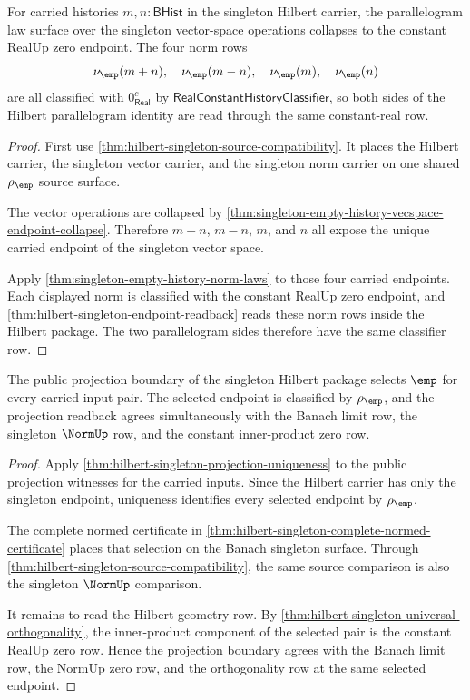 \begin{theorem}
\label{thm:hilbert-singleton-parallelogram-collapse}
For carried histories $m,n:\mathsf{BHist}$ in the singleton Hilbert carrier,
the parallelogram law surface over the singleton vector-space operations
collapses to the constant RealUp zero endpoint. The four norm rows
$$
\nu_{\emp}(m+n),\quad
\nu_{\emp}(m-n),\quad
\nu_{\emp}(m),\quad
\nu_{\emp}(n)
$$
are all classified with $0_{\mathsf{Real}}^{c}$ by
$\mathsf{RealConstantHistoryClassifier}$, so both sides of the Hilbert
parallelogram identity are read through the same constant-real row.
\end{theorem}
\begin{proof}
First use \autoref{thm:hilbert-singleton-source-compatibility}. It places the
Hilbert carrier, the singleton vector carrier, and the singleton norm carrier
on one shared $\rho_{\emp}$ source surface.

The vector operations are collapsed by
\autoref{thm:singleton-empty-history-vecspace-endpoint-collapse}. Therefore
$m+n$, $m-n$, $m$, and $n$ all expose the unique carried endpoint of the
singleton vector space.

Apply \autoref{thm:singleton-empty-history-norm-laws} to those four carried
endpoints. Each displayed norm is classified with the constant RealUp zero
endpoint, and \autoref{thm:hilbert-singleton-endpoint-readback} reads these
norm rows inside the Hilbert package. The two parallelogram sides therefore
have the same classifier row.
\end{proof}

\begin{theorem}
\label{thm:hilbert-singleton-projection-boundary}
The public projection boundary of the singleton Hilbert package selects
$\emp$ for every carried input pair. The selected endpoint is classified by
$\rho_{\emp}$, and the projection readback agrees simultaneously with the
Banach limit row, the singleton $\NormUp$ row, and the constant
inner-product zero row.
\end{theorem}
\begin{proof}
Apply \autoref{thm:hilbert-singleton-projection-uniqueness} to the public
projection witnesses for the carried inputs. Since the Hilbert carrier has
only the singleton endpoint, uniqueness identifies every selected endpoint by
$\rho_{\emp}$.

The complete normed certificate in
\autoref{thm:hilbert-singleton-complete-normed-certificate} places that
selection on the Banach singleton surface. Through
\autoref{thm:hilbert-singleton-source-compatibility}, the same source
comparison is also the singleton $\NormUp$ comparison.

It remains to read the Hilbert geometry row. By
\autoref{thm:hilbert-singleton-universal-orthogonality}, the inner-product
component of the selected pair is the constant RealUp zero row. Hence the
projection boundary agrees with the Banach limit row, the NormUp zero row,
and the orthogonality row at the same selected endpoint.
\end{proof}
